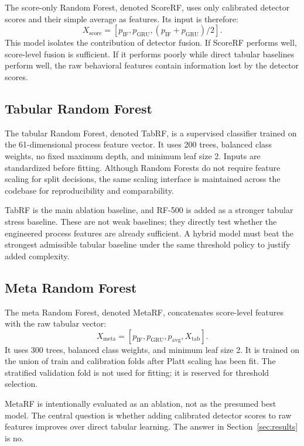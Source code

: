 \documentclass[10pt,journal,compsoc]{IEEEtran}
\begin{document}
The score-only Random Forest, denoted ScoreRF, uses only calibrated detector scores and their simple average as features. Its input is therefore:
\[
X_{\text{score}} = [p_{\text{IF}}, p_{\text{GRU}}, (p_{\text{IF}} + p_{\text{GRU}})/2].
\]
This model isolates the contribution of detector fusion. If ScoreRF performs well, score-level fusion is sufficient. If it performs poorly while direct tabular baselines perform well, the raw behavioral features contain information lost by the detector scores.

\subsection{Tabular Random Forest}

The tabular Random Forest, denoted TabRF, is a supervised classifier trained on the 61-dimensional process feature vector. It uses 200 trees, balanced class weights, no fixed maximum depth, and minimum leaf size 2. Inputs are standardized before fitting. Although Random Forests do not require feature scaling for split decisions, the same scaling interface is maintained across the codebase for reproducibility and comparability.

TabRF is the main ablation baseline, and RF-500 is added as a stronger tabular stress baseline. These are not weak baselines; they directly test whether the engineered process features are already sufficient. A hybrid model must beat the strongest admissible tabular baseline under the same threshold policy to justify added complexity.

\subsection{Meta Random Forest}

The meta Random Forest, denoted MetaRF, concatenates score-level features with the raw tabular vector:
\[
X_{\text{meta}} = [p_{\text{IF}}, p_{\text{GRU}}, p_{\text{avg}}, X_{\text{tab}}].
\]
It uses 300 trees, balanced class weights, and minimum leaf size 2. It is trained on the union of train and calibration folds after Platt scaling has been fit. The stratified validation fold is not used for fitting; it is reserved for threshold selection.

MetaRF is intentionally evaluated as an ablation, not as the presumed best model. The central question is whether adding calibrated detector scores to raw features improves over direct tabular learning. The answer in Section~\ref{sec:results} is no.
\end{document}
